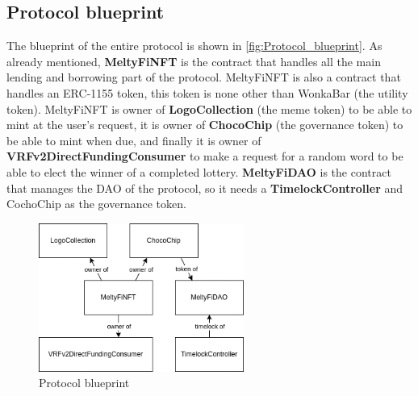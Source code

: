 \subsection{Protocol blueprint}
The blueprint of the entire protocol is shown in \autoref{fig:Protocol_blueprint}. As already mentioned, \textbf{MeltyFiNFT} is the contract that handles all the main lending and borrowing part of the protocol. MeltyFiNFT is also a contract that handles an ERC-1155 token, this token is none other than WonkaBar (the utility token). MeltyFiNFT is owner of \textbf{LogoCollection} (the meme token) to be able to mint at the user's request, it is owner of \textbf{ChocoChip} (the governance token) to be able to mint when due, and finally it is owner of \textbf{VRFv2DirectFundingConsumer} to make a request for a random word to be able to elect the winner of a completed lottery. \textbf{MeltyFiDAO} is the contract that manages the DAO of the protocol, so it needs a \textbf{TimelockController} and CochoChip as the governance token.
\begin{figure}[h]
    \centering
    \includegraphics[width=0.6\textwidth]{figures/Protocol_blueprint.png}
    \caption{Protocol blueprint}
    \label{fig:Protocol_blueprint}
\end{figure}

